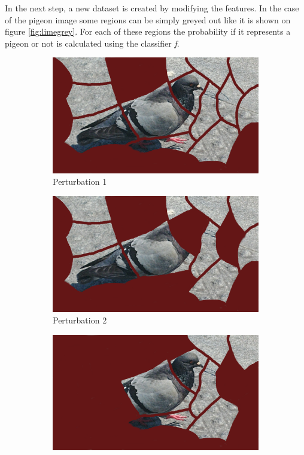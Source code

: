 In the next step, a new dataset is created by modifying the features. In the case of the pigeon image some regions can be simply greyed out like it is shown on figure \ref{fig:limegrey}. For each of these regions the probability if it represents a pigeon or not is calculated using the classifier \textit{f}.

\begin{figure}[H]
    \centering
    \begin{subfigure}[t]{0.32\linewidth}
        \centering
        \includegraphics[width=\linewidth]{images/lime/pert1}
        \caption{Perturbation 1}
    \end{subfigure}
    \begin{subfigure}[t]{0.32\linewidth}
        \centering
        \includegraphics[width=\linewidth]{images/lime/pert2}
        \caption{Perturbation 2}
    \end{subfigure}
    \begin{subfigure}[t]{0.32\linewidth}
        \centering
        \includegraphics[width=\linewidth]{images/lime/pert3}

\end{subfigure}
\end{figure}
